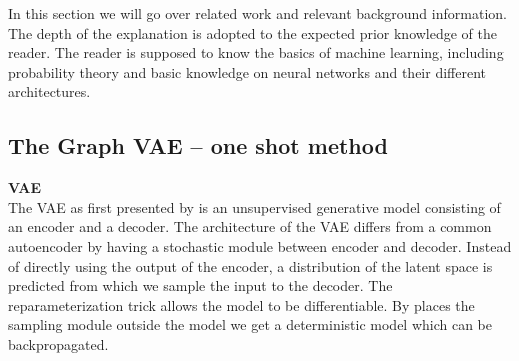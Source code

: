 In this section we will go over related work and relevant background information. The depth of the explanation is adopted to the expected prior knowledge of the reader. The reader is supposed to know the basics of machine learning, including probability theory and basic knowledge on neural networks and their different architectures.

\subsection{The Graph VAE – one shot method}

\textbf{VAE}\\
The VAE as first presented by \cite{kingma_auto-encoding_2014} is an unsupervised generative model consisting of an encoder and a decoder. The architecture of the VAE differs from a common autoencoder by having a stochastic module between encoder and decoder. Instead of directly using the output of the encoder, a distribution of the latent space is predicted from which we sample the input to the decoder. The reparameterization trick allows the model to be differentiable. By places the sampling module outside the model we get a deterministic model which can be backpropagated.


